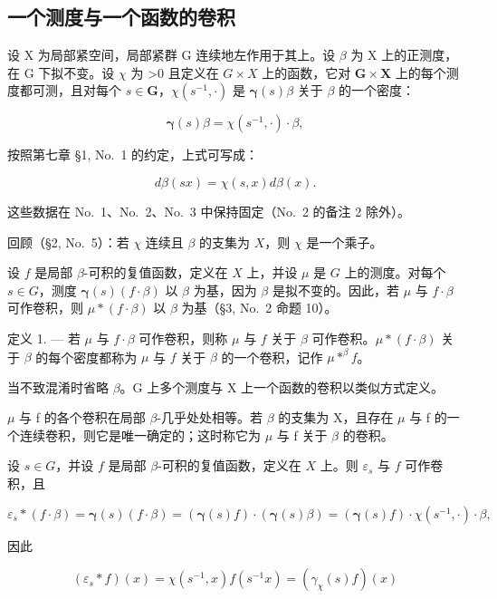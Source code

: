 \subsection{一个测度与一个函数的卷积}

设 X 为局部紧空间，局部紧群 G 连续地左作用于其上。设 \(\beta\) 为 X 上的正测度，在 G 下拟不变。设 \(\chi\) 为 \textgreater0 且定义在 \(G \times X\) 上的函数，它对 \(\mathbf{G} \times \mathbf{X}\) 上的每个测度都可测，且对每个 \(s \in \mathbf{G}\)，\(\chi(s^{-1}, \cdot)\) 是 \(\pmb{\gamma}(s)\beta\) 关于 \(\beta\) 的一个密度：

\[
\pmb {\gamma} (s) \beta = \chi (s ^ {- 1}, \cdot) \cdot \beta ,\tag{1}
\]

按照第七章 §1, No.~1 的约定，上式可写成：

\[
d \beta (s x) = \chi (s, x) d \beta (x).\tag{1'}
\]

这些数据在 No.~1、No.~2、No.~3 中保持固定（No.~2 的备注 2 除外）。

回顾（§2, No.~5）：若 \(\chi\) 连续且 \(\beta\) 的支集为 \(X\)，则 \(\chi\) 是一个乘子。

设 \(f\) 是局部 \(\beta\)-可积的复值函数，定义在 \(X\) 上，并设 \(\mu\) 是 \(G\) 上的测度。对每个 \(s \in G\)，测度 \(\boldsymbol{\gamma}(s)(f \cdot \beta)\) 以 \(\beta\) 为基，因为 \(\beta\) 是拟不变的。因此，若 \(\mu\) 与 \(f \cdot \beta\) 可作卷积，则 \(\mu * (f \cdot \beta)\) 以 \(\beta\) 为基（§3, No.~2 命题 10）。

定义 1. --- 若 \(\mu\) 与 \(f \cdot \beta\) 可作卷积，则称 \(\mu\) 与 \(f\) 关于 \(\beta\) 可作卷积。\(\mu * (f \cdot \beta)\) 关于 \(\beta\) 的每个密度都称为 \(\mu\) 与 \(f\) 关于 \(\beta\) 的一个卷积，记作 \(\mu * ^{\beta} f\)。

当不致混淆时省略 \(\beta\)。G 上多个测度与 X 上一个函数的卷积以类似方式定义。

\(\mu\) 与 f 的各个卷积在局部 \(\beta\)-几乎处处相等。若 \(\beta\) 的支集为 X，且存在 \(\mu\) 与 f 的一个连续卷积，则它是唯一确定的；这时称它为 \(\mu\) 与 f 关于 \(\beta\) 的卷积。

设 \(s \in G\)，并设 \(f\) 是局部 \(\beta\)-可积的复值函数，定义在 \(X\) 上。则 \(\varepsilon_s\) 与 \(f\) 可作卷积，且

\[
\varepsilon_ {s} * (f \cdot \beta) = \boldsymbol {\gamma} (s) (f \cdot \beta) = (\boldsymbol {\gamma} (s) f) \cdot (\boldsymbol {\gamma} (s) \beta) = (\boldsymbol {\gamma} (s) f) \cdot \chi (s ^ {- 1}, \cdot) \cdot \beta ,
\]

因此

\[
\left(\varepsilon_ {s} * f\right) (x) = \chi \left(s ^ {- 1}, x\right) f \left(s ^ {- 1} x\right) = \left(\gamma_ {\chi} (s) f\right) (x)\tag{2}
\]

